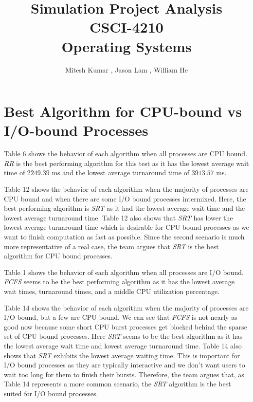\documentclass{article}
\title{\textbf{Simulation Project Analysis} \\ 
       \textbf{CSCI-4210} \\ 
       \textbf{Operating Systems}}
\author{Mitesh Kumar {\tt <kumarm4>}, Jason Lam {\tt <lamj7>}, William He {\tt <hew7>}}
\begin{document}
\maketitle
\tableofcontents

\section{Best Algorithm for CPU-bound vs I/O-bound Processes}
\begin{doublespace}

Table 6 shows the behavior of each algorithm when all processes are CPU bound. \textit{RR} is the best performing
algorithm for this test as it has the lowest average wait time of $2249.39$ ms and the lowest average turnaround 
time of $3913.57$ ms.

Table 12 shows the behavior of each algorithm when the majority of processes are CPU bound and when there are some 
I/O bound processes intermixed. Here, the best performing algorithm is \textit{SRT} as it had the lowest 
average wait time and the lowest average turnaround time. Table 12 also shows that \textit{SRT}
has lower the lowest average turnaround time which is desirable for CPU bound processes as we want
to finish computation as fast as possible. Since the second scenario is much more representative of 
a real case, the team argues that \textit{SRT} is the best algorithm for CPU bound processes.

Table 1 shows the behavior of each algorithm when all processes are I/O bound. \textit{FCFS} seems to be the best 
performing algorithm as it has the lowest average wait times, turnaround times, and a middle CPU utilization percentage.

Table 14 shows the behavior of each algorithm when the majority of processes are I/O bound, but a few are CPU bound. We 
can see that \textit{FCFS} is not nearly as good now because some short CPU burst processes get blocked behind the 
sparse set of CPU bound processes. Here \textit{SRT} seems to be the best algorithm as it has the lowest average wait time
and lowest average turnaround time. Table 14 also shows that
\textit{SRT} exhibits the lowest average waiting time. This is important for I/O bound processes
as they are typically interactive and we don't want users to wait too long for them to finish their bursts.
Therefore, the team argues that, as Table 14 represents a more common scenario, the \textit{SRT}
algorithm is the best suited for I/O bound processes.
\end{doublespace}
\end{document}
